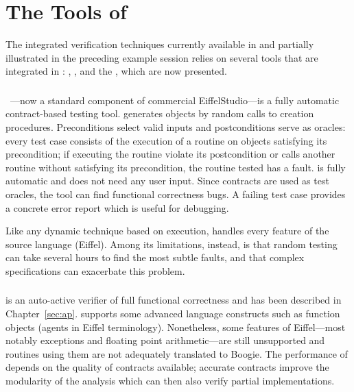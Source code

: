 \section{The Tools of \EVE} \label{tools-of-eve}

The integrated verification techniques currently available in \EVE 
and partially illustrated in the preceding example session relies on several 
tools that are integrated in \EVE: \AutoProof, \AutoTest, and the \Inspector, which are now presented.

\subsubsection{\AutoTest}

\AutoTest~\cite{MEYER09}---now a standard component of commercial EiffelStudio---is a fully automatic contract-based testing tool.
\AutoTest generates objects by random calls to creation procedures.
Preconditions select valid inputs and postconditions serve as oracles: every test case consists of the execution of a routine on objects satisfying its precondition; if executing the routine violate its postcondition or calls another routine without satisfying its precondition, the routine tested has a fault.
\AutoTest is fully automatic and does not need any user input. Since contracts are used as test oracles, the tool can find functional correctness bugs.
A failing test case provides a concrete error report which is useful for debugging.

Like any dynamic technique based on execution, \AutoTest handles every feature of the source language (Eiffel).
Among its limitations, instead, is that random testing can take several hours to find the most subtle faults, and that complex specifications can exacerbate this problem.


\subsubsection{\AutoProof}

\AutoProof is an auto-active verifier of full functional correctness and has been described in Chapter~\ref{sec:ap}.
\AutoProof supports some advanced language constructs such as function objects (agents in Eiffel terminology). Nonetheless, some features of Eiffel---most notably exceptions and floating point arithmetic---are still unsupported and routines using them are not adequately translated to Boogie.
The performance of \AutoProof depends on the quality of contracts available; accurate contracts improve the modularity of the analysis which can then also verify partial implementations.


